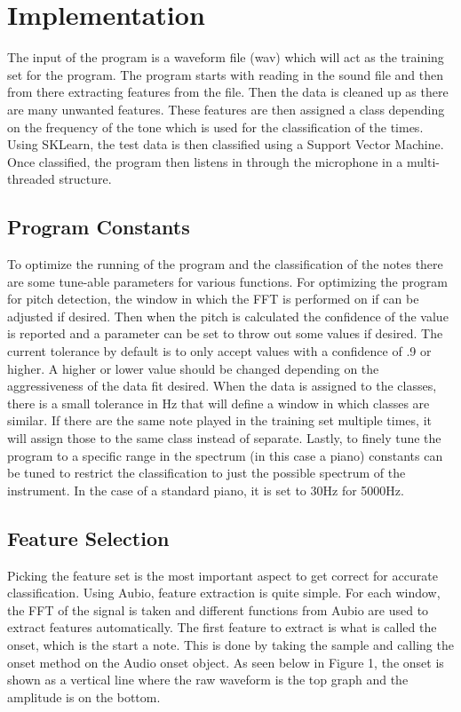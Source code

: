 \documentclass[conference]{IEEEtran}
\begin{document}
\section{Implementation}
\label{sec:impl}

The input of the program is a waveform file (wav) which will act as the training set for the program.  The program starts with reading in the sound file and then from there extracting features from the file.  Then the data is cleaned up as there are many unwanted features.  These features are then assigned a class depending on the frequency of the tone which is used for the classification of the times.  Using SKLearn, the test data is then classified using a Support Vector Machine.  Once classified, the program then listens in through the microphone in a multi-threaded structure.  

\subsection{Program Constants}
\label{sec:const}

To optimize the running of the program and the classification of the notes there are some tune-able parameters for various functions.  For optimizing the program for pitch detection, the window in which the FFT is performed on if can be adjusted if desired.  Then when the pitch is calculated the confidence of the value is reported and a parameter can be set to throw out some values if desired.  The current tolerance by default is to only accept values with a confidence of .9 or higher.  A higher or lower value should be changed depending on the aggressiveness of the data fit desired.  When the data is assigned to the classes, there is a small tolerance in Hz that will define a window in which classes are similar.  If there are the same note played in the training set multiple times, it will assign those to the same class instead of separate.  Lastly, to finely tune the program to a specific range in the spectrum (in this case a piano) constants can be tuned to restrict the classification to just the possible spectrum of the instrument.  In the case of a standard piano, it is set to 30Hz for 5000Hz.

\subsection{Feature Selection}
\label{sec:feat}
Picking the feature set is the most important aspect to get correct for accurate classification.  Using Aubio, feature extraction is quite simple.  For each window, the FFT of the signal is taken and different functions from Aubio are used to extract features automatically.  The first feature to extract is what is called the onset, which is the start a note.  This is done by taking the sample and calling the onset method on the Audio onset object.  As seen below in Figure 1, the onset is shown as a vertical line where the raw waveform is the top graph and the amplitude is on the bottom.
\end{document}
